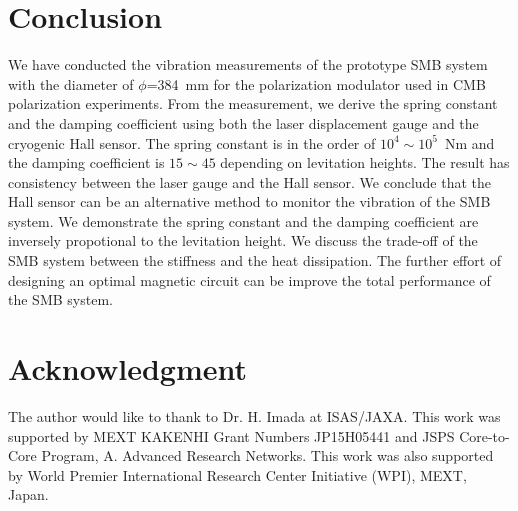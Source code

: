 \documentclass[a4paper,11pt]{jpconf}
\begin{document}
\section{Conclusion}
We have conducted the vibration measurements of the prototype SMB system with the diameter of $\phi$=384~mm for the polarization modulator used in CMB polarization experiments.
From the measurement, we derive the spring constant and the damping coefficient using both the laser displacement gauge and the cryogenic Hall sensor.
The spring constant is in the order of $10^{4} \sim 10^{5}$~Nm and the damping coefficient is $15\sim45$ depending on levitation heights.
The result has consistency between the laser gauge and the Hall sensor.
We conclude that the Hall sensor can be an alternative method to monitor the vibration of the SMB system.
We demonstrate the spring constant and the damping coefficient are inversely propotional to the levitation height.
We discuss the trade-off of the SMB system between the stiffness and the heat dissipation.
The further effort of designing an optimal magnetic circuit can be improve the total performance of the SMB system.

\section{Acknowledgment}
The author would like to thank to Dr. H. Imada at ISAS/JAXA.
This work was supported by MEXT KAKENHI Grant Numbers JP15H05441 and JSPS Core-to-Core Program, A. Advanced Research Networks.
This work was also supported by World Premier International Research Center Initiative (WPI), MEXT, Japan.
\end{document}
